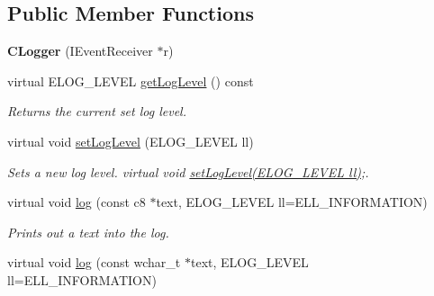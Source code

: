 \subsection*{Public Member Functions}
\begin{DoxyCompactItemize}
\item 
\hypertarget{classirr_1_1_c_logger_acea3fe8fa50eaf3702db1c6022d4466d}{{\bfseries C\-Logger} (I\-Event\-Receiver $\ast$r)}\label{classirr_1_1_c_logger_acea3fe8fa50eaf3702db1c6022d4466d}

\item 
\hypertarget{classirr_1_1_c_logger_aafd9c742c30ea032072f3bba4d683f21}{virtual E\-L\-O\-G\-\_\-\-L\-E\-V\-E\-L \hyperlink{classirr_1_1_c_logger_aafd9c742c30ea032072f3bba4d683f21}{get\-Log\-Level} () const }\label{classirr_1_1_c_logger_aafd9c742c30ea032072f3bba4d683f21}

\begin{DoxyCompactList}\small\item\em Returns the current set log level. \end{DoxyCompactList}\item 
virtual void \hyperlink{classirr_1_1_c_logger_aecb10c9d6ae7813fbcd925a09df13b1b}{set\-Log\-Level} (E\-L\-O\-G\-\_\-\-L\-E\-V\-E\-L ll)
\begin{DoxyCompactList}\small\item\em Sets a new log level. virtual void \hyperlink{classirr_1_1_c_logger_aecb10c9d6ae7813fbcd925a09df13b1b}{set\-Log\-Level(\-E\-L\-O\-G\-\_\-\-L\-E\-V\-E\-L ll)};. \end{DoxyCompactList}\item 
\hypertarget{classirr_1_1_c_logger_a91f424570619db5072d13e51ae253bcf}{virtual void \hyperlink{classirr_1_1_c_logger_a91f424570619db5072d13e51ae253bcf}{log} (const c8 $\ast$text, E\-L\-O\-G\-\_\-\-L\-E\-V\-E\-L ll=E\-L\-L\-\_\-\-I\-N\-F\-O\-R\-M\-A\-T\-I\-O\-N)}\label{classirr_1_1_c_logger_a91f424570619db5072d13e51ae253bcf}

\begin{DoxyCompactList}\small\item\em Prints out a text into the log. \end{DoxyCompactList}\item 
\hypertarget{classirr_1_1_c_logger_acdc4bcb5f8a9cfe9dffb5e1527558019}{virtual void \hyperlink{classirr_1_1_c_logger_acdc4bcb5f8a9cfe9dffb5e1527558019}{log} (const wchar\-\_\-t $\ast$text, E\-L\-O\-G\-\_\-\-L\-E\-V\-E\-L ll=E\-L\-L\-\_\-\-I\-N\-F\-O\-R\-M\-A\-T\-I\-O\-N)}\label{classirr_1_1_c_logger_acdc4bcb5f8a9cfe9dffb5e1527558019}


\end{DoxyCompactItemize}
